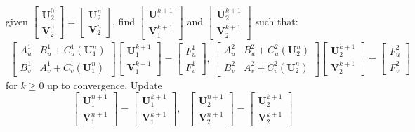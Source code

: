 given $\begin{bmatrix} \mathbf{U}_2^{0} \\ \mathbf{V}_2^{0} \end{bmatrix} = \begin{bmatrix} \mathbf{U}_2^{n} \\ \mathbf{V}_2^{n} \end{bmatrix}$, find $\begin{bmatrix} \mathbf{U}_1^{k+1} \\ \mathbf{V}_1^{k+1} \end{bmatrix}$ and $\begin{bmatrix} \mathbf{U}_2^{k+1} \\ \mathbf{V}_2^{k+1} \end{bmatrix}$ such that:
\begin{equation}\label{eq:LinSysRR}
\begin{aligned}
    \begin{bmatrix}
    A_u^1 & B_u^1 + C_u^1\left(  \mathbf{U}_1^n\right) \\
    B_v^1 & A_v^1 + C_v^1\left(  \mathbf{U}_1^n\right)
    \end{bmatrix} \begin{bmatrix}
    \mathbf{U}_1^{k+1} \\ \mathbf{V}_1^{k+1} \end{bmatrix} = \begin{bmatrix} F^1_u \\ F^1_v
    \end{bmatrix}, \
    \begin{bmatrix}
    A_u^2 & B_u^2 + C_u^2\left(  \mathbf{U}_2^n\right) \\
    B_v^2 & A_v^2 + C_v^2\left(  \mathbf{U}_2^n\right)
    \end{bmatrix} \begin{bmatrix}
    \mathbf{U}_2^{k+1} \\ \mathbf{V}_2^{k+1} \end{bmatrix} = \begin{bmatrix} F^2_u \\ F^2_v
    \end{bmatrix}
\end{aligned}\end{equation}
for $k \geq 0$ up to convergence. Update
\begin{equation*}
  \begin{bmatrix} \mathbf{U}_1^{n+1} \\ \mathbf{V}_1^{n+1} \end{bmatrix} = \begin{bmatrix} \mathbf{U}_1^{k+1} \\ \mathbf{V}_1^{k+1} \end{bmatrix}, \ \ \ \begin{bmatrix} \mathbf{U}_2^{n+1} \\ \mathbf{V}_2^{n+1} \end{bmatrix} = \begin{bmatrix} \mathbf{U}_2^{k+1} \\ \mathbf{V}_2^{k+1} \end{bmatrix}
\end{equation*}

